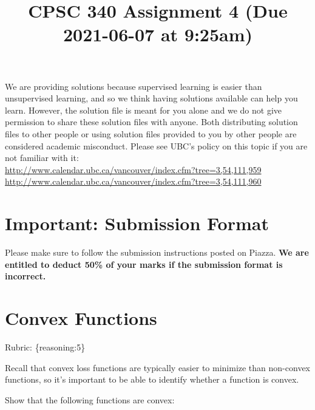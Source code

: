 \documentclass{article}
\def\rubric#1{\gre{Rubric: \{#1\}}}{}
\def\blu#1{{\color{blu}#1}}
\def\gre#1{{\color{gre}#1}}
\def\red#1{{\color{red}#1}}
\begin{document}
\title{CPSC 340 Assignment 4 (Due 2021-06-07 at 9:25am)}
\date{}
\maketitle

\vspace{-4em}

\red{We are providing solutions because supervised learning is easier than unsupervised learning, and so we think having solutions available can help you learn. However, the solution file is meant for you alone and we do not give permission to share these solution files with anyone. Both distributing solution files to other people or using solution files provided to you by other people are considered academic misconduct. Please see UBC's policy on this topic if you are not familiar with it:\\
\url{http://www.calendar.ubc.ca/vancouver/index.cfm?tree=3,54,111,959}\\
\url{http://www.calendar.ubc.ca/vancouver/index.cfm?tree=3,54,111,960}}

\section*{Important: Submission Format}

Please make sure to follow the submission instructions posted on Piazza. \textbf{We are entitled to deduct 50\% of your marks if the submission format is incorrect.}

\section{Convex Functions}
\rubric{reasoning:5}

Recall that convex loss functions are typically easier to minimize than non-convex functions, so it's important to be able to identify whether a function is convex.

\blu{Show that the following functions are convex}:
\end{document}
